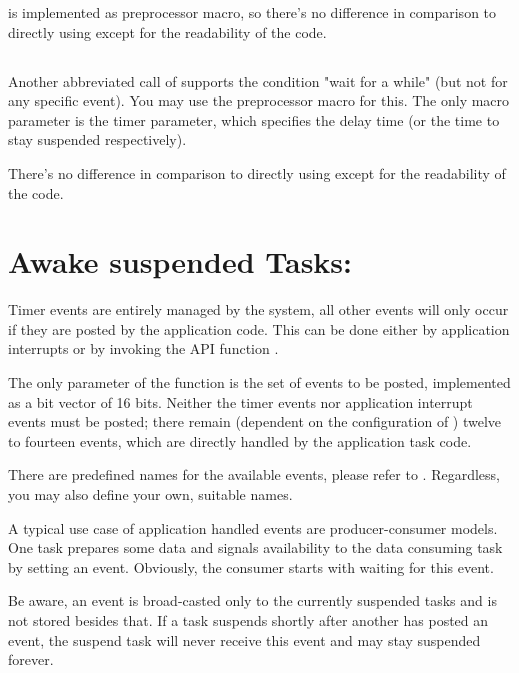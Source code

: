  is implemented as preprocessor macro, so
there's no difference in comparison to directly using
 except for the readability of the code.


\subsection{}

Another abbreviated call of  supports the
condition "wait for a while" (but not for any specific event). You may use
the preprocessor macro  for this. The only macro
parameter is the timer parameter, which specifies the delay time (or the
time to stay suspended respectively).

There's no difference in comparison to directly using
 except for the readability of the code.


\section{Awake suspended Tasks: }

Timer events are entirely managed by the system, all other events will
only occur if they are posted by the application code. This can be done
either by application interrupts or by invoking the API function
.

The only parameter of the function is the set of events to be posted,
implemented as a bit vector of 16 bits. Neither the timer events nor
application interrupt events must be posted; there remain (dependent on
the configuration of \rtos{}) twelve to fourteen events, which are
directly handled by the application task code.

There are predefined names for the available events, please refer to
. Regardless, you may also define your own, suitable names.

A typical use case of application handled events are producer-consumer
models. One task prepares some data and signals availability to the data
consuming task by setting an event. Obviously, the consumer starts with
waiting for this event.

Be aware, an event is broad-casted only to the currently suspended tasks
and is not stored besides that. If a task suspends shortly after another
has posted an event, the suspend task will never receive this event and
may stay suspended forever.


